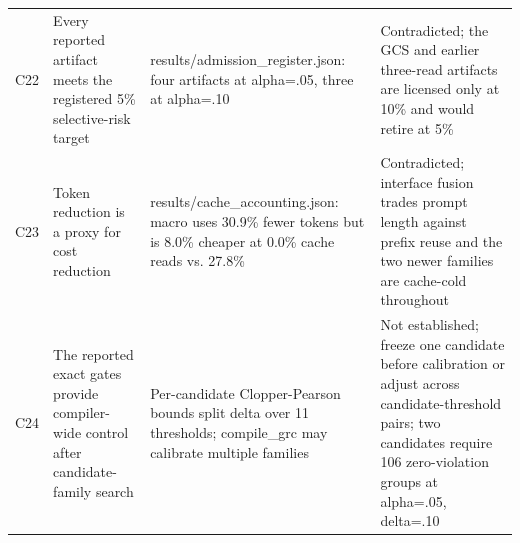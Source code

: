 \begin{tabularx}{\linewidth}{@{}l >{\raggedright\arraybackslash}X >{\raggedright\arraybackslash}X >{\raggedright\arraybackslash}X@{}}
C22 & Every reported artifact meets the registered 5\% selective-risk target & results/\allowbreak{}admission\_\allowbreak{}register.\allowbreak{}json: four artifacts at alpha=.05, three at alpha=.10 & Contradicted; the GCS and earlier three-read artifacts are licensed only at 10\% and would retire at 5\% \\
C23 & Token reduction is a proxy for cost reduction & results/\allowbreak{}cache\_\allowbreak{}accounting.\allowbreak{}json: macro uses 30.9\% fewer tokens but is 8.0\% cheaper at 0.0\% cache reads vs. 27.8\% & Contradicted; interface fusion trades prompt length against prefix reuse and the two newer families are cache-cold throughout \\
C24 & The reported exact gates provide compiler-wide control after candidate-family search & Per-candidate Clopper-Pearson bounds split delta over 11 thresholds; compile\_grc may calibrate multiple families & Not established; freeze one candidate before calibration or adjust across candidate-threshold pairs; two candidates require 106 zero-violation groups at alpha=.05, delta=.10 \\
\bottomrule
\end{tabularx}
